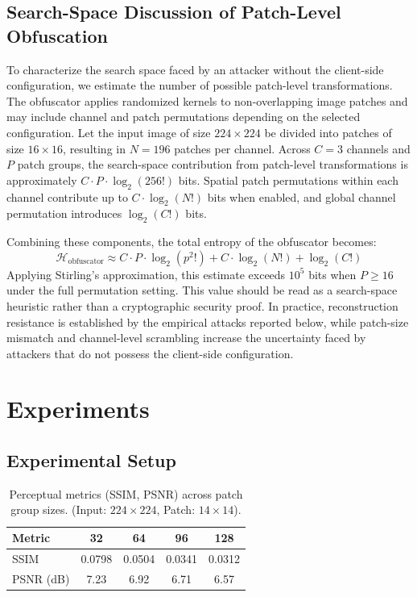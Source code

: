 \documentclass{ieeeaccess}
\newcommand{\rev}[1]{{\color{green}#1}}
\begin{document}
\subsection{\rev{Search-Space Discussion of Patch-Level Obfuscation}}

\rev{To characterize the search space faced by an attacker without the client-side configuration, we estimate the number of possible patch-level transformations. The obfuscator applies randomized kernels to non-overlapping image patches and may include channel and patch permutations depending on the selected configuration. Let the input image of size $224 \times 224$ be divided into patches of size $16 \times 16$, resulting in $N = 196$ patches per channel. Across $C = 3$ channels and $P$ patch groups, the search-space contribution from patch-level transformations is approximately $C \cdot P \cdot \log_2(256!)$ bits. Spatial patch permutations within each channel contribute up to $C \cdot \log_2(N!)$ bits when enabled, and global channel permutation introduces $\log_2(C!)$ bits.}

Combining these components, the total entropy of the obfuscator becomes:
\begin{equation}
\mathcal{H}_{\text{obfuscator}} \approx C \cdot P \cdot \log_2(p^2!) + C \cdot \log_2(N!) + \log_2(C!)
\end{equation}
\rev{Applying Stirling's approximation, this estimate exceeds $10^5$ bits when $P \geq 16$ under the full permutation setting. This value should be read as a search-space heuristic rather than a cryptographic security proof. In practice, reconstruction resistance is established by the empirical attacks reported below, while patch-size mismatch and channel-level scrambling increase the uncertainty faced by attackers that do not possess the client-side configuration.}

\section{Experiments} \label{sec:exp}

\subsection{Experimental Setup}

\begin{table}[!t]
\caption{Perceptual metrics (SSIM, PSNR) across patch group sizes. (Input: $224 \times 224$, Patch: $14 \times 14$).}
\label{tab:obf-metrics}
\centering
\begin{tabular}{l|c|c|c|c}
\toprule
\textbf{Metric} & \textbf{32} & \textbf{64} & \textbf{96} & \textbf{128} \\ 
\midrule

SSIM         & 0.0798 & 0.0504 & 0.0341 & 0.0312\\

PSNR (dB)    & 7.23   & 6.92   & 6.71 & 6.57\\
\bottomrule
\end{tabular}
\end{table}
\end{document}
